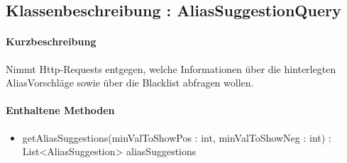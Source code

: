 \subsection{Klassenbeschreibung : AliasSuggestionQuery}%
\paragraph*{Kurzbeschreibung}
Nimmt Http-Requests entgegen, welche Informationen über die hinterlegten AliasVorschläge sowie über die Blacklist abfragen wollen.
\paragraph*{Enthaltene Methoden}
\begin{itemize}
    \item getAliasSuggestions(minValToShowPos : int, minValToShowNeg : int) : List<AliasSuggestion> aliasSuggestions
\end{itemize}